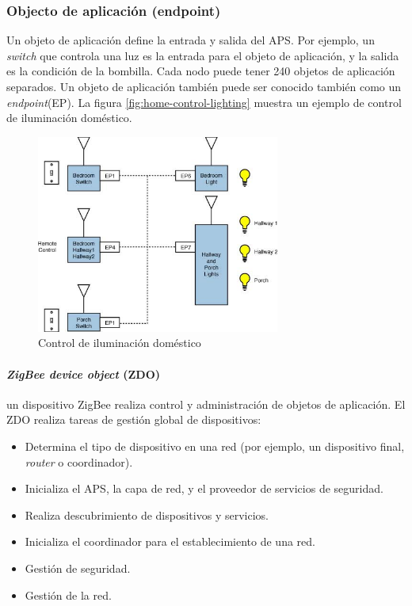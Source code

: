 \documentclass[10pt,journal,compsoc]{IEEEtran}
\begin{document}
\subsubsection{Objecto de aplicación (endpoint)}
Un objeto de aplicación define la entrada y salida del APS. Por ejemplo, un \emph{switch} que controla una luz es la entrada para el objeto de aplicación, y la salida es la condición de la bombilla. Cada nodo puede tener 240 objetos de aplicación separados. Un objeto de aplicación también puede ser conocido también como un \emph{endpoint}(EP). La figura \ref{fig:home-control-lighting} muestra un ejemplo de control de iluminación doméstico.

\begin{figure}[h]
    \centering
    \includegraphics[width=8cm]{home-controlling-lighting}
    \caption{Control de iluminación doméstico}
    \label{fig:home-control-ligthing}
\end{figure}

\paragraph{\emph{ZigBee device object} (ZDO)} un dispositivo ZigBee realiza control y administración de objetos de aplicación. El ZDO realiza tareas de gestión global de dispositivos:
\begin{itemize}
    \item Determina el tipo de dispositivo en una red (por ejemplo, un dispositivo final, \emph{router} o coordinador).
    \item Inicializa el APS, la capa de red, y el proveedor de servicios de seguridad.
    \item Realiza descubrimiento de dispositivos y servicios.
    \item Inicializa el coordinador para el establecimiento de una red.
    \item Gestión de seguridad.
    \item Gestión de la red.
\end{itemize}
\end{document}
